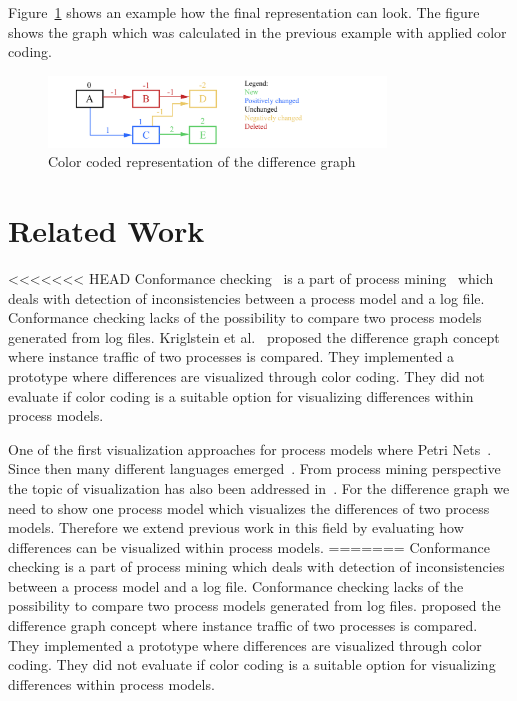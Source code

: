 \documentclass{llncs}
\begin{document}
\begin{keywords}
Figure~\ref{fig:DiffGraphVisualization} shows an example how the final representation can look. The figure shows the graph which was calculated in the previous example with applied color coding.

\begin{figure}
	\centering
	\includegraphics[width=0.8\textwidth]{Images/ColorCodedGraph.PNG}
	\caption{Color coded representation of the difference graph}
	\label{fig:DiffGraphVisualization}
\end{figure}

\section{Related Work}  %
\label{sec:RelatedWork}

<<<<<<< HEAD
Conformance checking~\cite{lit:ConformanceCheckingOfProcesses} is a part of process mining~\cite{lit:PMDiscoveryConformanceEnhancement,lit:BusinnessProcessMiningAnIndustrialAppliction} which deals with detection of inconsistencies between a process model and a log file. Conformance checking lacks of the possibility to compare two process models generated from log files. Kriglstein et al.~\cite{lit:VisuApprDiffAnalysis} proposed the difference graph concept where instance traffic of two processes is compared. They implemented a prototype where differences are visualized through color coding. They did not evaluate if color coding is a suitable option for visualizing differences within process models.

One of the first visualization approaches for process models where Petri Nets~\cite{lit:Petrinet}. Since then many different languages emerged~\cite{lit:UML,lit:EPC,lit:YAWL}. From process mining perspective the topic of visualization has also been addressed in~\cite{lit:ProMFramework}. For the difference graph we need to show one process model which visualizes the differences of two process models. Therefore we extend previous work in this field by evaluating how differences can be visualized within process models.
=======
Conformance checking \cite{lit:ConformanceCheckingOfProcesses} is a part of process mining \cite{lit:BusinnessProcessMiningAnIndustrialAppliction,lit:PMDiscoveryConformanceEnhancement} which deals with detection of inconsistencies between a process model and a log file. Conformance checking lacks of the possibility to compare two process models generated from log files. \cite{lit:VisuApprDiffAnalysis} proposed the difference graph concept where instance traffic of two processes is compared. They implemented a prototype where differences are visualized through color coding. They did not evaluate if color coding is a suitable option for visualizing differences within process models.


\end{keywords}
\end{document}
